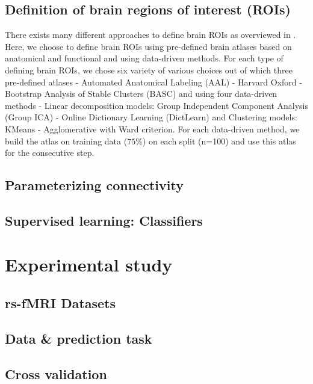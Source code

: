 \documentclass[5p]{elsarticle}
\begin{document}
\subsection{Definition of brain regions of interest (ROIs)}
There exists many different approaches to define brain ROIs as overviewed
in \cite{thirion2014}. Here, we choose to
define brain ROIs using pre-defined brain atlases based on
anatomical and functional and using data-driven methods. For each type of
defining brain ROIs, we chose six variety of various
choices out of which three
pre-defined atlases - Automated Anatomical Labeling (AAL) - Harvard Oxford
- Bootstrap Analysis of Stable Clusters (BASC) and using four data-driven
methods - Linear decomposition models: Group Independent Component
Analysis (Group ICA) - Online Dictionary Learning (DictLearn) and
Clustering models: KMeans - Agglomerative with Ward criterion. For each
data-driven method, we build the atlas on training data ($75\%$) on each
split (n=100) and use this atlas for the consecutive step.


\subsection{Parameterizing connectivity}

\subsection{Supervised learning: Classifiers}

\section{Experimental study}

\subsection{rs-fMRI Datasets}

\subsection{Data \& prediction task}
\subsection{Cross validation}
\end{document}
